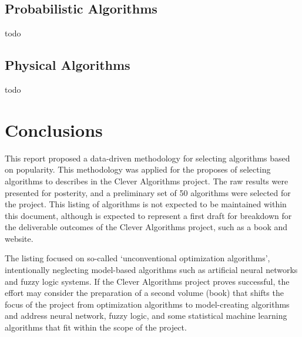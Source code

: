 \documentclass[a4paper, 11pt]{article}
\begin{document}
\subsection{Probabilistic Algorithms}
todo

\subsection{Physical Algorithms}
todo

% 
% 
\section{Conclusions}
\label{sec:conclusions}
This report proposed a data-driven methodology for selecting algorithms based on popularity. This methodology was applied for the proposes of selecting algorithms to describes in the Clever Algorithms project. The raw results were presented for posterity, and a preliminary set of 50 algorithms were selected for the project. This listing of algorithms is not expected to be maintained within this document, although is expected to represent a first draft for breakdown for the deliverable outcomes of the Clever Algorithms project, such as a book and website. 

The listing focused on so-called `unconventional optimization algorithms', intentionally neglecting model-based algorithms such as artificial neural networks and fuzzy logic systems. If the Clever Algorithms project proves successful, the effort may consider the preparation of a second volume (book) that shifts the focus of the project from optimization algorithms to model-creating algorithms and address neural network, fuzzy logic, and some statistical machine learning algorithms that fit within the scope of the project.



\end{document}
